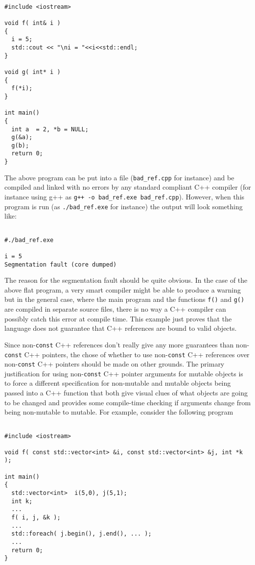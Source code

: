 {\scriptsize\begin{verbatim}

#include <iostream>

void f( int& i )
{
  i = 5;
  std::cout << "\ni = "<<i<<std::endl;
}

void g( int* i )
{
  f(*i);
}

int main()
{
  int a  = 2, *b = NULL;
  g(&a);
  g(b);
  return 0;
}

\end{verbatim}}

The above program can be put into a file ({}\texttt{bad\_ref.cpp} for
instance) and be compiled and linked with no errors by any standard
compliant C++ compiler (for instance using g++ as {}\texttt{g++ -o
bad\_ref.exe bad\_ref.cpp}).  However, when this program is run (as
{}\texttt{./bad\_ref.exe} for instance) the output will look something
like:

{\scriptsize\begin{verbatim}

#./bad_ref.exe

i = 5
Segmentation fault (core dumped)

\end{verbatim}}

The reason for the segmentation fault should be quite obvious.  In the
case of the above flat program, a very smart compiler might be able to
produce a warning but in the general case, where the main program and
the functions {}\texttt{f()} and {}\texttt{g()} are compiled in
separate source files, there is no way a C++ compiler can possibly
catch this error at compile time.  This example just proves that the
language does not guarantee that C++ references are bound to valid
objects.

Since non-{}\texttt{const} C++ references don't really give any more
guarantees than non-{}\texttt{const} C++ pointers, the chose of
whether to use non-{}\texttt{const} C++ references over
non-{}\texttt{const} C++ pointers should be made on other grounds.
The primary justification for using non-{}\texttt{const} C++ pointer
arguments for mutable objects is to force a different specification
for non-mutable and mutable objects being passed into a C++ function
that both give visual clues of what objects are going to be changed
and provides some compile-time checking if arguments change from being
non-mutable to mutable.  For example, consider the following program

{\scriptsize\begin{verbatim}

#include <iostream>

void f( const std::vector<int> &i, const std::vector<int> &j, int *k );

int main()
{
  std::vector<int>  i(5,0), j(5,1);
  int k;
  ...
  f( i, j, &k );
  ...
  std::foreach( j.begin(), j.end(), ... );
  ...
  return 0;
}

\end{verbatim}}

